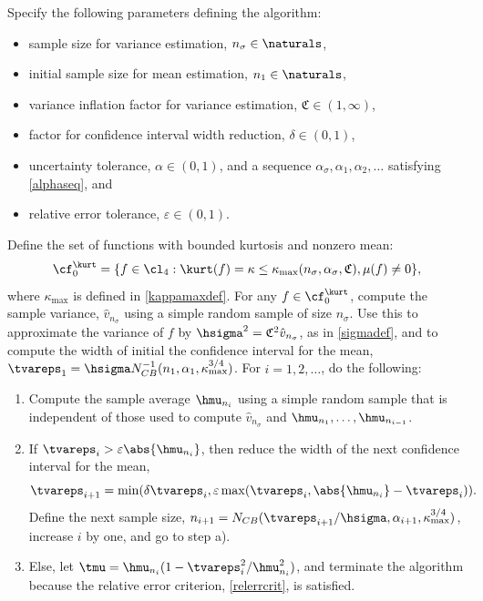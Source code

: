 \documentclass[graybox]{svmult}
\newcommand{\hv}{\hat{v}}
\newcommand{\fudge}{\mathfrak{C}}
\begin{document}
\begin{theorem} \label{relerradaptthm} Specify the following parameters defining the algorithm:
\begin{itemize}
\item sample size for variance estimation, $n_{\sigma} \in \naturals$,
\item initial sample size for mean estimation, $n_1 \in \naturals$,
\item variance inflation factor for variance estimation, $\fudge \in (1,\infty)$, 
\item factor for confidence interval width reduction, $\delta \in (0,1)$,
\item uncertainty tolerance, $\alpha\in (0,1)$, and a sequence $\alpha_{\sigma}, \alpha_1,  \alpha_2, \ldots$ satisfying \eqref{alphaseq}, and
\item relative error tolerance, $\varepsilon \in (0,1)$. 
\end{itemize} 
Define the set of functions with bounded kurtosis and nonzero mean:
\[
\cf^{\kurt}_0= \{f \in \cl_{4} : \kurt(f)= \kappa \le \kappa_{\max}(n_{\sigma},\alpha_{\sigma},\fudge), \mu(f) \ne 0\},
\]
where $\kappa_{\max}$ is defined in \eqref{kappamaxdef}.  For any $f \in \cf^{\kurt}_0$, compute the sample variance, $\hv_{n_{\sigma}}$ using a simple random sample of size $n_{\sigma}$. Use this to approximate the variance of $f$ by $\hsigma^2 = \fudge^2 \hv_{n_{\sigma}}$, as in \eqref{sigmadef}, and to compute the width of initial the confidence interval for the mean, $\tvareps_1=\hsigma N_{CB}^{-1}(n_1,\alpha_1,\kappa_{\max}^{3/4})$.  For $i=1, 2, \ldots$, do the following:
\begin{enumerate}
\renewcommand{\labelenumi}{\alph{enumi})}
\item Compute the sample average $\hmu_{n_i}$ using a simple random sample that is independent of those used to compute $\hv_{n_{\sigma}}$ and $\hmu_{n_1}, \ldots, \hmu_{n_{i-1}}$.

\item If $\tvareps_i > \varepsilon \abs{\hmu_{n_i}}$, then reduce the width of the next confidence interval for the mean, 
\[
\tvareps_{i+1} = \min(\delta\tvareps_i, \varepsilon \max(\tvareps_i,\abs{\hmu_{n_i}}-\tvareps_i)).
\]
Define the next sample size, $n_{i+1} = N_{CB}(\tvareps_{i+1}/\hsigma,\alpha_{i+1},\kappa_{\max}^{3/4})$,
increase $i$ by one, and go to step a). 

\item Else, let $\tmu = \hmu_{n_i}(1 - \tvareps_i^2/\hmu_{n_i}^2)$, and terminate the algorithm because the relative error criterion, \eqref{relerrcrit}, is satisfied.

\end{enumerate}
\end{theorem}
\end{document}
